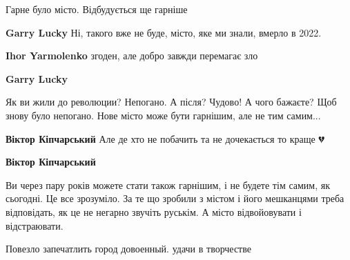  
 
 
 
 

\qqSecCmt


Гарне було місто. Відбудується ще гарніше

\begin{itemize} %
\textbf{Garry Lucky} Ні, такого вже не буде, місто, яке ми знали, вмерло в 2022.

\textbf{Ihor Yarmolenko} згоден, але добро завжди перемагає зло

\textbf{Garry Lucky} 

\obeycr
Як ви жили до революции?
Непогано.
А після?
Чудово!
А чого бажаєте?
Щоб знову було непогано.
Нове місто може бути гарнішим, але не тим самим...
\restorecr

\textbf{Віктор Кіпчарський} Але де хто не побачить та не дочекається то краще 💔

\textbf{Віктор Кіпчарський} 

Ви через пару років можете стати також гарнішим, і не будете тім самим, як
сьогодні. Це все зрозуміло. За те що зробили з містом і його мешканцями треба
відповідать, як це не негарно звучіть руськім. А місто відвойовувати і
відстраювати.

\end{itemize} %


Повезло запечатлить город довоенный. удачи в творчестве
